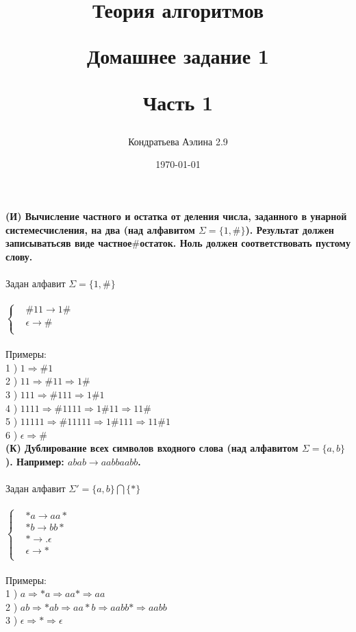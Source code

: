 \documentclass[a4paper,25pt]{book}
\title{Теория алгоритмов

Домашнее задание 1

Часть 1}
\author{Кондратьева Аэлина 2.9}
\date{\today}
\begin{document}
\maketitle
\newpage

\textbf{(И) Вычисление частного и остатка от деления числа, 
заданного в унарной системесчисления, на два (над алфавитом
$\Sigma = \{1,\#\}$). Результат должен записыватьсяв виде 
частное$\#$остаток.
Ноль должен соответствовать пустому слову.}\\\\
Задан алфавит $\Sigma = \{1,\#\}$\\\\
$ \left\{
\begin{aligned}
& \#11 \rightarrow 1\# \\
&  \epsilon \rightarrow \# \\
\end{aligned}
\right.$
\\\\
Примеры:\\
1 ) $1 \Rightarrow \#1$\\
2 ) $11 \Rightarrow \#11 \Rightarrow 1\# $\\
3 ) $111 \Rightarrow \#111 \Rightarrow 1\#1 $\\
4 ) $1111 \Rightarrow \#1111 \Rightarrow 1\#11 \Rightarrow 11\# $\\
5 ) $11111 \Rightarrow \#11111 \Rightarrow 1\#111 \Rightarrow 11\#1 $\\
6 ) $\epsilon \Rightarrow \# $\\

\textbf{(К) Дублирование всех символов входного слова (над алфавитом
$\Sigma = \{a, b \}$). Например: $abab \rightarrow aabbaabb$.}\\\\
Задан алфавит $\Sigma' = \{a, b \} \bigcap \{*\}$\\\\
$ \left\{
\begin{aligned}
& *a \rightarrow aa* \\
& *b \rightarrow bb* \\
& * \rightarrow .\epsilon \\
& \epsilon  \rightarrow  * \\
\end{aligned}
\right.$
\\\\
Примеры:\\
1 ) $a \Rightarrow *a \Rightarrow aa* \Rightarrow aa $\\
2 ) $ab \Rightarrow *ab \Rightarrow aa*b \Rightarrow aabb* \Rightarrow aabb $\\
3 ) $\epsilon \Rightarrow * \Rightarrow \epsilon $\\
\end{document}
